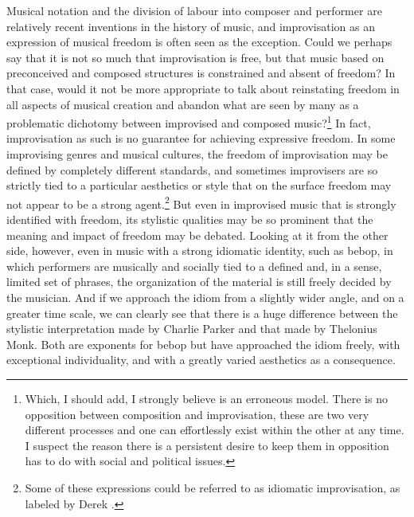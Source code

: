 \documentclass[a4paper]{article}
\begin{document}
Musical notation and the division of labour into composer and performer are relatively recent inventions in the history of music, and improvisation as an expression of musical freedom is often seen as the exception. Could we perhaps say that it is not so much that improvisation is free, but that music based on preconceived and composed structures is constrained and absent of freedom? In that case, would it not be more appropriate to talk about reinstating freedom in all aspects of musical creation and abandon what are seen by many as a problematic dichotomy between improvised and composed music?\footnote{Which, I should add, I strongly believe is an erroneous model. There is no opposition between composition and improvisation, these are two very different processes and one can effortlessly exist within the other at any time. I suspect the reason there is a persistent desire to keep them in opposition has to do with social and political issues.} In fact, improvisation as such is no guarantee for achieving expressive freedom. In some improvising genres and musical cultures, the freedom of improvisation may be defined by completely different standards, and sometimes improvisers are so strictly tied to a particular aesthetics or style that on the surface freedom may not appear to be a strong agent.\footnote{Some of these expressions could be referred to as idiomatic improvisation, as labeled by Derek \citet{bailey92}.} But even in improvised music that is strongly identified with freedom, its stylistic qualities may be so prominent that the meaning and impact of freedom may be debated. Looking at it from the other side, however, even in music with a strong idiomatic identity, such as bebop, in which performers are musically and socially tied to a defined and, in a sense, limited set of phrases, the organization of the material is still freely decided by the musician. And if we approach the idiom from a slightly wider angle, and on a greater time scale, we can clearly see that there is a huge difference between the stylistic interpretation made by Charlie Parker and that made by Thelonius Monk. Both are exponents for bebop but have approached the idiom freely, with exceptional individuality, and with a greatly varied aesthetics as a consequence.
\end{document}
